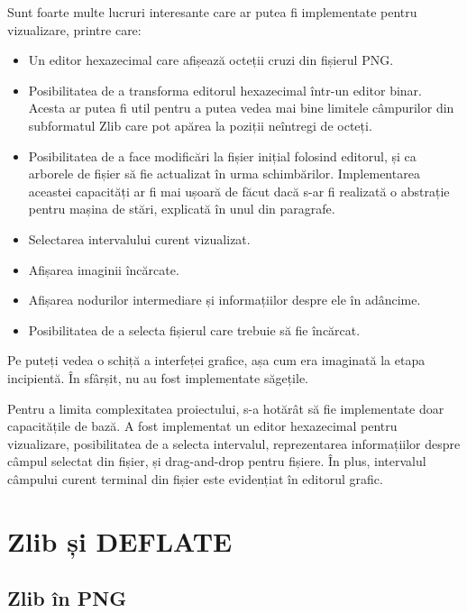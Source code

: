 \documentclass[a4paper,12pt]{report}
\begin{document}
Sunt foarte multe lucruri interesante care ar putea fi implementate pentru vizualizare, printre care:
\begin{itemize}
    \item
        Un editor hexazecimal care afișează octeții cruzi din fișierul \ac{PNG}. 
    \item
        Posibilitatea de a transforma editorul hexazecimal într-un editor binar.
        Acesta ar putea fi util pentru a putea vedea mai bine limitele câmpurilor din
        subformatul Zlib care pot apărea la poziții neîntregi de octeți.
    \item
        Posibilitatea de a face modificări la fișier inițial folosind editorul,
        și ca arborele de fișier să fie actualizat în urma schimbărilor.
        Implementarea aceastei capacități ar fi mai ușoară de făcut dacă s-ar fi realizată
        o abstrație pentru mașina de stări, explicată în unul din paragrafe.
    \item
        Selectarea intervalului curent vizualizat.
    \item
        Afișarea imaginii încărcate.
    \item
        Afișarea nodurilor intermediare și informațiilor despre ele în adâncime.
    \item
        Posibilitatea de a selecta fișierul care trebuie să fie încărcat.
\end{itemize}

Pe  puteți vedea o schiță a interfeței grafice,
așa cum era imaginată la etapa incipientă.
În sfârșit, nu au fost implementate săgețile.


Pentru a limita complexitatea proiectului, s-a hotărât să fie implementate doar capacitățile de bază.
A fost implementat un editor hexazecimal pentru vizualizare, posibilitatea de a selecta intervalul,
reprezentarea informațiilor despre câmpul selectat din fișier, și drag-and-drop pentru fișiere.
În plus, intervalul câmpului curent terminal din fișier este evidențiat în editorul grafic.



\section{Zlib și DEFLATE}

\subsection{Zlib în \ac{PNG}}
\end{document}
